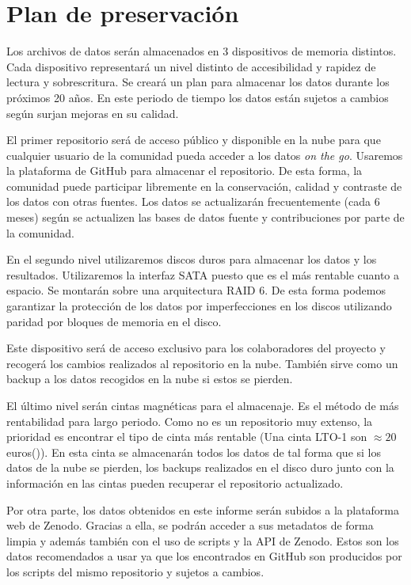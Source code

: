 \documentclass[12pt, spanish]{article}
\begin{document}
\section{Plan de preservación}
Los archivos de datos serán almacenados en 3 dispositivos de memoria distintos. Cada dispositivo representará un nivel distinto de accesibilidad y rapidez de lectura y sobrescritura. Se creará un plan para almacenar los datos durante los próximos 20 años. En este periodo de tiempo los datos están sujetos a cambios según surjan mejoras en su calidad.

El primer repositorio será de acceso público y disponible en la nube para que cualquier usuario de la comunidad pueda acceder a los datos \textit{on the go}. Usaremos la plataforma de GitHub para almacenar el repositorio. De esta forma, la comunidad puede participar libremente en la conservación, calidad y contraste de los datos con otras fuentes. Los datos se actualizarán frecuentemente (cada 6 meses) según se actualizen las bases de datos fuente y contribuciones por parte de la comunidad.

En el segundo nivel utilizaremos discos duros para almacenar los datos y los resultados. Utilizaremos la interfaz SATA puesto que es el más rentable cuanto a espacio. Se montarán sobre una arquitectura RAID 6. De esta forma podemos garantizar la protección de los datos por imperfecciones en los discos utilizando paridad por bloques de memoria en el disco.

Este dispositivo será de acceso exclusivo para los colaboradores del proyecto y recogerá los cambios realizados al repositorio en la nube. También sirve como un backup a los datos recogidos en la nube si estos se pierden.

El último nivel serán cintas magnéticas para el almacenaje. Es el método de más rentabilidad para largo periodo. Como no es un repositorio muy extenso, la prioridad es encontrar el tipo de cinta más rentable (Una cinta LTO-1 son $\approx 20$ euros(\cite{Backupworks.com2020})). En esta cinta se almacenarán todos los datos de tal forma que si los datos de la nube se pierden, los backups realizados en el disco duro junto con la información en las cintas pueden recuperar el repositorio actualizado.


Por otra parte, los datos obtenidos en este informe serán subidos a la plataforma web de Zenodo. Gracias a ella, se podrán acceder a sus metadatos de forma limpia y además también con el uso de scripts y la API de Zenodo. Estos son los datos recomendados a usar ya que los encontrados en GitHub son producidos por los scripts del mismo repositorio y sujetos a cambios.
\end{document}
